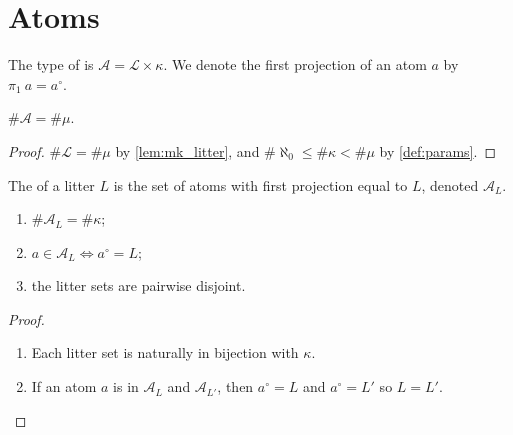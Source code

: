 \section{Atoms}

\begin{definition}
    The type of  is \( \mathcal A = \mathcal L \times \kappa \).
    We denote the first projection of an atom \( a \) by \( \pi_1\ a = a^\circ \).
\end{definition}
\begin{lemma}
    \label{lem:mk_atom}
    \( \#\mathcal A = \#\mu \).
\end{lemma}
\begin{proof}
    \( \#\mathcal L = \#\mu \) by \cref{lem:mk_litter}, and \( \#\aleph_0 \leq \#\kappa < \#\mu \) by \cref{def:params}.
\end{proof}
\begin{definition}
    The  of a litter \( L \) is the set of atoms with first projection equal to \( L \), denoted \( \mathcal A_L \).
\end{definition}
\begin{lemma}
    \label{lem:litterSet}
    \begin{enumerate}
        \item \( \#\mathcal A_L = \#\kappa \);
        \item \( a \in \mathcal A_L \Leftrightarrow a^\circ = L \);
        \item the litter sets are pairwise disjoint.
    \end{enumerate}
\end{lemma}
\begin{proof}
    \begin{enumerate}
        \item Each litter set is naturally in bijection with \( \kappa \).
        \item If an atom \( a \) is in \( \mathcal A_L \) and \( \mathcal A_{L'} \), then \( a^\circ = L \) and \( a^\circ = L' \) so \( L = L' \).
    \end{enumerate}
\end{proof}
